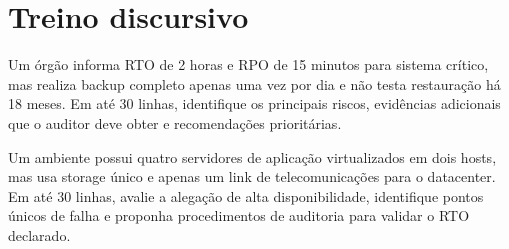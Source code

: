 \section{Treino discursivo}

\begin{discursiva}
Um órgão informa RTO de 2 horas e RPO de 15 minutos para sistema crítico, mas realiza backup completo apenas uma vez por dia e não testa restauração há 18 meses. Em até 30 linhas, identifique os principais riscos, evidências adicionais que o auditor deve obter e recomendações prioritárias.
\end{discursiva}

\begin{discursiva}
Um ambiente possui quatro servidores de aplicação virtualizados em dois hosts, mas usa storage único e apenas um link de telecomunicações para o datacenter. Em até 30 linhas, avalie a alegação de alta disponibilidade, identifique pontos únicos de falha e proponha procedimentos de auditoria para validar o RTO declarado.
\end{discursiva}



